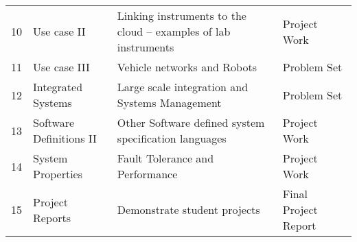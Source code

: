 \begin{table}[h]
\begin{tabular}{p{1cm}p{4cm}p{6cm}p{2cm}}
10    & Use case II              & Linking instruments to the cloud – examples of lab instruments                                                       & Project Work         \\
11    & Use case III             & Vehicle networks and Robots                                                                                          & Problem Set          \\
12    & Integrated Systems       & Large scale integration and Systems Management                                                                       & Problem Set          \\
13    & Software Definitions II  & Other Software defined system specification languages                                                                & Project Work         \\
14    & System Properties        & Fault Tolerance and Performance                                                                                      & Project Work         \\
15    & Project Reports          & Demonstrate student projects                                                                                         & Final Project Report
\end{tabular}
\end{table}